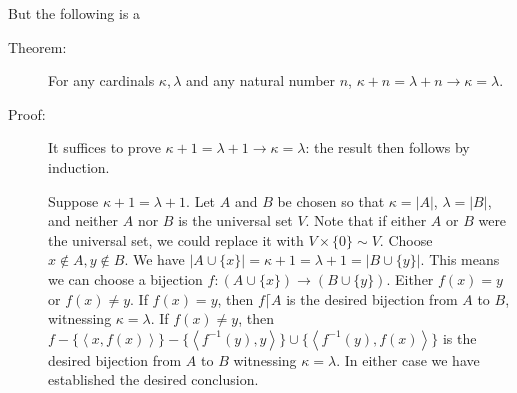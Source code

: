 \documentclass[12pt]{book}
\begin{document}
But the following is a

\begin{description}

\item[Theorem:] For any cardinals $\kappa,\lambda$ and any natural
number $n$, $\kappa+n = \lambda+n \rightarrow \kappa=\lambda$.

\item[Proof:] It suffices to prove $\kappa+1 = \lambda+1 \rightarrow
\kappa=\lambda$: the result then follows by induction.

Suppose $\kappa+1=\lambda+1$.  Let $A$ and $B$ be chosen so that
$\kappa=|A|$, $\lambda=|B|$, and neither $A$ nor $B$ is the universal
set $V$.  Note that if either $A$ or $B$ were the universal set, we
could replace it with $V \times\{0\} \sim V$.  Choose $x \not\in A, y
\not\in B$.  We have $|A \cup \{x\}| = \kappa+1 = \lambda+1 = |B \cup
\{y\}|$.  This means we can choose a bijection $f:(A \cup \{x\})
\rightarrow (B \cup \{y\})$.  Either $f(x)=y$ or $f(x) \neq y$.  If
$f(x)=y$, then $f\lceil A$ is the desired bijection from $A$ to $B$,
witnessing $\kappa=\lambda$.  If $f(x)\neq y$, then $f -
\{\left<x,f(x)\right>\} - \{\left<f^{-1}(y),y\right>\} \cup
\{\left<f^{-1}(y),f(x)\right>\}$ is the desired bijection from $A$ to
$B$ witnessing $\kappa=\lambda$.  In either case we have established
the desired conclusion.

\end{description}

\newpage
\end{document}
